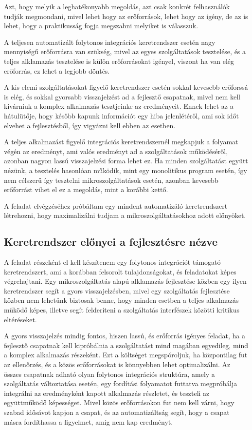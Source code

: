 \documentclass[11pt,magyar,a4paper,twoside,]{report}
\begin{document}
Azt, hogy melyik a leghatékonyabb megoldás, azt csak konkrét
felhasználók tudják megmondani, mivel lehet hogy az erőforrások, lehet
hogy az igény, de az is lehet, hogy a praktikusság fogja megszabni
melyiket is válasszuk.

A teljesen automatizált folytonos integrációs keretrendszer esetén nagy
mennyiségű erőforrásra van szükség, mivel az egyes szolgáltatások
tesztelése, és a teljes alklamazás tesztelése is külön erőforrásokat
igényel, viszont ha van elég erőforrás, ez lehet a legjobb döntés.

A kis elemi szolgáltatásokat figyelő keretrendszer esetén sokkal
kevesebb erőforssá is elég, és sokkal gyorsabb visszajelzést ad a
fejlesztő csapatnak, mivel nem kell kivárniuk a komplex alkalmazás
tesztjeinke az eredményeit. Ennek lehet az a hátulütője, hogy később
kapunk információt egy hiba jelenlétéről, ami sok időt elvehet a
fejlesztésből, így vigyázni kell ebben az esetben.

A teljes alkalmazást figyelő integrációs keretrendszernél megkapjuk a
folyamat végén az eredményt, ami valós eredményt ad a szolgáltatások
működéséről, azonban nagyon lassú visszajelzési forma lehet ez. Ha
minden szolgáltatást együtt nézünk, a tesztelés hasonlóan működik, mint
egy monolitikus program esetén, így nem célszerű így tesztelni
mikroszolgáltatások esetén, azonban kevesebb erőforrást vihet el ez a
megoldás, mint a korábbi kettő.

A feladat elvégzéséhez próbáltam egy mindent automatizáló keretrendszert
létrehozni, hogy maximalizálni tudjam a mikroszolgáltatásokhoz adott
előnyöket.

\subsection{Keretrendszer előnyei a fejlesztésre
nézve}\label{keretrendszer-elux151nyei-a-fejlesztuxe9sre-nuxe9zve}

A feladat részeként el kell készítenem egy folytonos integrációt
támogató keretrendszert, ami a korábban felsorolt tulajdonságokat, és
feladatokat képes végrehajtani. Egy mikroszolgáltatás alapú alklamazás
fejlesztése közben egy ilyen keretrendszer segít a gyors
visszajelzésben, mivel egy szolgáltatás fejlesztése közben nem lehetünk
biztosak benne, hogy minden esetben a teljes alkalmazás működő képes,
illetve segít felderíteni a szolgáltatás interfészek közötti kritikus
eltéréseket.

A gyors visszajelzés mindig fontos, hiszen lassú, és erőforrás igényes
feladat, ha a fejlesztő csapatnak kell kipróbálnia a szolgáltatást mind
magában egyedileg, mind a komplex alkalmazás részeként. Ezt a költséget
megspóroljuk, ha központilag fut az ellenőrzés, és a közös erőforrásokat
is könnyebben lehet optimalizálni. Az összes csapatnak adható olyan
folytonos integrációs struktúra, amely a szolgáltatás változtatása
esetén, egy fordítási folyamatot futtatva megpróbálja integrálni az
eredményként kapott alkalmazás részletet, és teszteli az együttműködő
képességet. Mivel közös erőforrásokon fut nem kell várni, hogy szabad
idősávot kapjon a csapat, és az automatizáltság segít, hogy a csapat
másra fordíthassa a figyelmet, amíg nem kap eredményt.
\end{document}
